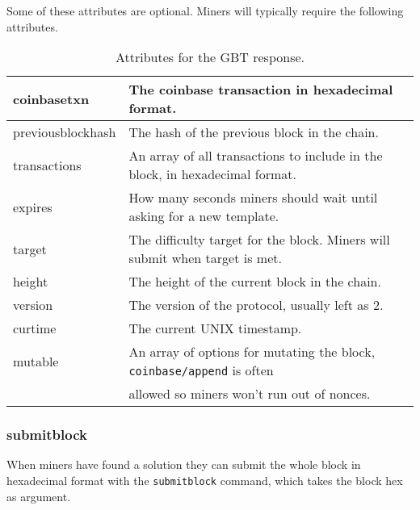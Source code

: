 Some of these attributes are optional. Miners will typically require the following attributes.

\begin{table}[H]
\centering
\begin{tabular}{|l|l|}
\hline
coinbasetxn       & The coinbase transaction in hexadecimal format.                                                                                           \\ \hline
previousblockhash & The hash of the previous block in the chain.                                                                                              \\ \hline
transactions      & An array of all transactions to include in the block, in hexadecimal format.                                                              \\ \hline
expires           & How many seconds miners should wait until asking for a new template.                                                           \\ \hline
target            & The difficulty target for the block. Miners will submit when target is met.                                                           \\ \hline
height            & The height of the current block in the chain.                                                                                             \\ \hline
version           & The version of the protocol, usually left as 2.                                                                                           \\ \hline
curtime           & The current UNIX timestamp.                                                                                                               \\ \hline
mutable           & An array of options for mutating the block, \texttt{coinbase/append} is often \\ & allowed so miners won't run out of nonces. \\ \hline
\end{tabular}
\caption{Attributes for the GBT response.}
\end{table}


\subsubsection{submitblock}

When miners have found a solution they can submit the whole block in hexadecimal format with the \texttt{submitblock} command, which takes the block hex as argument.

